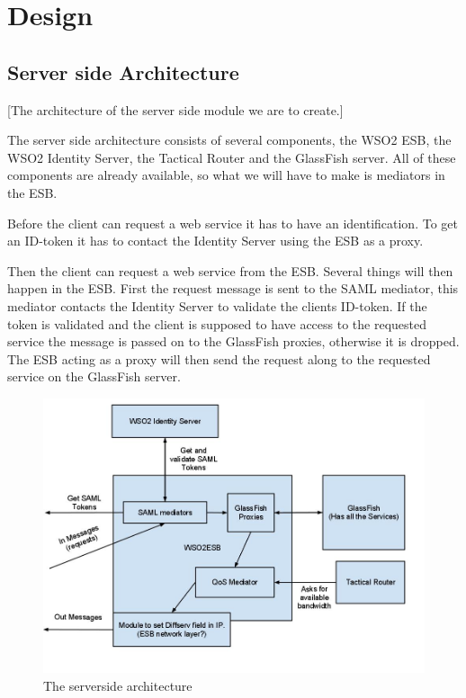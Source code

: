 \documentclass[12pt]{article}
\begin{document}
\section{Design}\label{design}
    \subsection{Server side Architecture}\label{serversidearch} [The architecture of the server side module we are to create.] 
    
        The server side architecture consists of several components, the WSO2 ESB, the WSO2 Identity Server, the Tactical Router and the GlassFish server. All of these components are already available, so what we will have to make is mediators in the ESB.

        Before the client can request a web service it has to have an identification. To get an ID-token it has to contact the Identity Server using the ESB as a proxy.
        
        Then the client can request a web service from the ESB. Several things will then happen in the ESB. First the request message is sent to the SAML mediator, this mediator contacts the Identity Server to validate the clients ID-token. If the token is validated and the client is supposed to have access to the requested service the message is passed on to the GlassFish proxies, otherwise it is dropped. The ESB acting as a proxy will then send the request along to the requested service on the GlassFish server.

        \begin{figure}
            \includegraphics[scale=0.5]{serverside}
            \caption{The serverside architecture}
            \label{fig:serverside}
        \end{figure}
\end{document}
